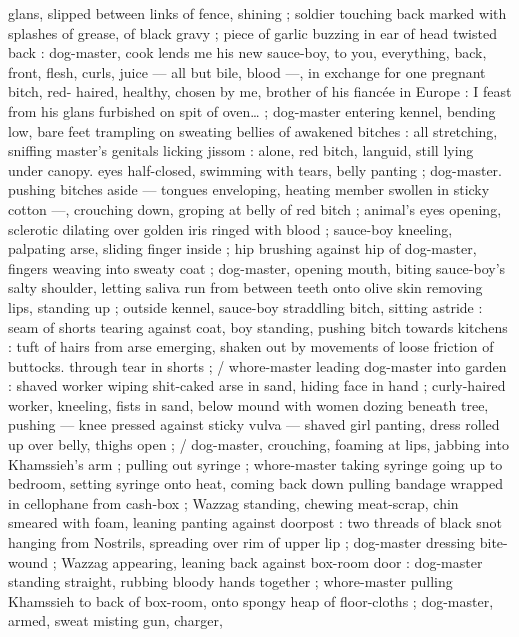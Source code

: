 {%
glans, slipped between links of fence, shining ; soldier touching back 
marked with splashes of grease, of black gravy ; piece of garlic 
buzzing in ear of head twisted back : {\gl}{\td} dog-master, cook lends me 
his new sauce-boy, to you, everything, back, front, flesh, curls, juice 
--- all but bile, blood ---, in exchange for one pregnant bitch, red- 
haired, healthy, chosen by me, brother of his fiancée in Europe : I 
feast from his glans furbished on spit of oven{\ldots} {\gr} ; dog-master 
entering kennel, bending low, bare feet trampling on sweating bellies 
of awakened bitches : all stretching, sniffing master's genitals 
licking jissom : alone, red bitch, languid, still lying under canopy. 
eyes half-closed, swimming with tears, belly panting ; dog-master. 
pushing bitches aside --- tongues enveloping, heating member 
swollen in sticky cotton ---, crouching down, groping at belly of red 
bitch ; animal's eyes opening, sclerotic dilating over golden iris 
ringed with blood ; sauce-boy kneeling, palpating arse, sliding finger 
inside ; hip brushing against hip of dog-master, fingers weaving into 
sweaty coat ; dog-master, opening mouth, biting sauce-boy's salty 
shoulder, letting saliva run from between teeth onto olive skin 
removing lips, standing up ; outside kennel, sauce-boy straddling 
bitch, sitting astride : seam of shorts tearing against coat, boy 
standing, pushing bitch towards kitchens : tuft of hairs from arse 
emerging, shaken out by movements of loose friction of buttocks. 
through tear in shorts ; {\slash} whore-master leading dog-master into 
garden : shaved worker wiping shit-caked arse in sand, hiding face 
in hand ; curly-haired worker, kneeling, fists in sand, below mound 
with women dozing beneath tree, pushing --- knee pressed against 
sticky vulva --- shaved girl panting, dress rolled up over belly, thighs 
open ; {\slash} dog-master, crouching, foaming at lips, jabbing into 
Khamssieh's arm ; pulling out syringe ; whore-master taking syringe 
going up to bedroom, setting syringe onto heat, coming back down 
pulling bandage wrapped in cellophane from cash-box ; Wazzag 
standing, chewing meat-scrap, chin smeared with foam, leaning 
panting against doorpost : two threads of black snot hanging from 
Nostrils, spreading over rim of upper lip ; dog-master dressing bite- 
wound ; Wazzag appearing, leaning back against box-room door : 
dog-master standing straight, rubbing bloody hands together ; 
whore-master pulling Khamssieh to back of box-room, onto spongy 
heap of floor-cloths ; dog-master, armed, sweat misting gun, charger, 
}
